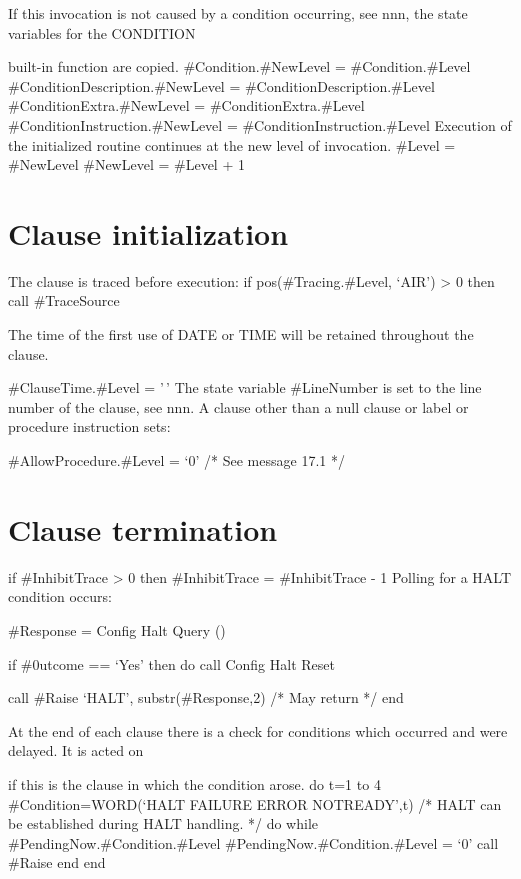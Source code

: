 If this invocation is not caused by a condition occurring, see nnn, the
state variables for the CONDITION

built-in function are copied. \#Condition.\#NewLevel =
\#Condition.\#Level \#ConditionDescription.\#NewLevel =
\#ConditionDescription.\#Level \#ConditionExtra.\#NewLevel =
\#ConditionExtra.\#Level \#ConditionInstruction.\#NewLevel =
\#ConditionInstruction.\#Level Execution of the initialized routine
continues at the new level of invocation. \#Level = \#NewLevel
\#NewLevel = \#Level + 1

\hypertarget{clause-initialization}{%
\section{Clause initialization}\label{clause-initialization}}

The clause is traced before execution: if pos(\#Tracing.\#Level, `AIR')
\textgreater{} 0 then call \#TraceSource

The time of the first use of DATE or TIME will be retained throughout
the clause.

\#ClauseTime.\#Level = '\,' The state variable \#LineNumber is set to
the line number of the clause, see nnn. A clause other than a null
clause or label or procedure instruction sets:

\#AllowProcedure.\#Level = `0' /* See message 17.1 */

\hypertarget{clause-termination}{%
\section{Clause termination}\label{clause-termination}}

if \#InhibitTrace \textgreater{} 0 then \#InhibitTrace = \#InhibitTrace
- 1 Polling for a HALT condition occurs:

\#Response = Config Halt Query ()

if \#0utcome == `Yes' then do call Config Halt Reset

call \#Raise `HALT', substr(\#Response,2) /* May return */ end

At the end of each clause there is a check for conditions which occurred
and were delayed. It is acted on

if this is the clause in which the condition arose. do t=1 to 4
\#Condition=WORD(`HALT FAILURE ERROR NOTREADY',t) /* HALT can be
established during HALT handling. */ do while
\#PendingNow.\#Condition.\#Level \#PendingNow.\#Condition.\#Level = `0'
call \#Raise end end

